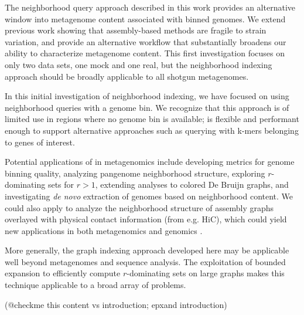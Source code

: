 The neighborhood query approach described in this work provides an
alternative window into metagenome content associated with binned genomes. We extend previous work
showing that assembly-based methods are fragile to strain
variation, and provide an alternative workflow that substantially
broadens our ability to characterize metagenome content.  This first
investigation focuses on only two data sets, one mock and one real, but
the neighborhood indexing approach should be broadly applicable to
all shotgun metagenomes.

In this initial investigation of neighborhood indexing, we have
focused on using neighborhood queries with a genome bin.  We recognize
that this approach is of limited use in regions where no genome bin is
available; \sgc is flexible and performant enough to support
alternative approaches such as querying with k-mers belonging to genes
of interest.

Potential applications of \sgc in metagenomics include developing
metrics for genome binning quality, analyzing pangenome neighborhood
structure, exploring $r$-dominating sets for $r > 1$, extending analyses
to colored De Bruijn graphs, and investigating {\em de novo}
extraction of genomes based on neighborhood content.  We could also
apply \sgc to analyze the neighborhood structure of assembly graphs
overlayed with physical contact information (from e.g. HiC), which could
yield new applications in both metagenomics and genomics
\cite{Marbouty2014,Beitel2014}.

More generally, the graph indexing approach developed here may be
applicable well beyond metagenomes and sequence analysis.  The
exploitation of bounded expansion to efficiently compute $r$-dominating
sets on large graphs makes this technique applicable to a broad array
of problems.

(@checkme this content vs introduction; epxand introduction)
